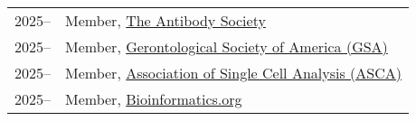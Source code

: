 \begin{longtable}[l]{@{}p{} p{}}

    2025-- & Member, \href{https://www.antibodysociety.org/}{The Antibody Society} \\

    2025-- & Member, \href{https://www.geron.org}{Gerontological Society of America (GSA)} \\

    2025-- & Member, \href{https://ascanet.org/}{Association of Single Cell Analysis (ASCA)} \\

    2025-- & Member, \href{https://www.bioinformatics.org/}{Bioinformatics.org} \\

\end{longtable}
